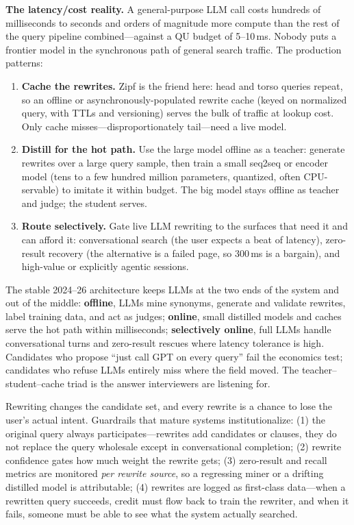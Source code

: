 \textbf{The latency/cost reality.} A general-purpose LLM call costs hundreds of milliseconds to seconds and orders of magnitude more compute than the rest of the query pipeline combined---against a QU budget of 5--10\,ms. Nobody puts a frontier model in the synchronous path of general search traffic. The production patterns:
\begin{enumerate}
    \item \textbf{Cache the rewrites.} Zipf is the friend here: head and torso queries repeat, so an offline or asynchronously-populated rewrite cache (keyed on normalized query, with TTLs and versioning) serves the bulk of traffic at lookup cost. Only cache misses---disproportionately tail---need a live model.
    \item \textbf{Distill for the hot path.} Use the large model offline as a teacher: generate rewrites over a large query sample, then train a small seq2seq or encoder model (tens to a few hundred million parameters, quantized, often CPU-servable) to imitate it within budget. The big model stays offline as teacher and judge; the student serves.
    \item \textbf{Route selectively.} Gate live LLM rewriting to the surfaces that need it and can afford it: conversational search (the user expects a beat of latency), zero-result recovery (the alternative is a failed page, so 300\,ms is a bargain), and high-value or explicitly agentic sessions.
\end{enumerate}

\begin{keyinsight}
The stable 2024--26 architecture keeps LLMs at the two ends of the system and out of the middle: \textbf{offline}, LLMs mine synonyms, generate and validate rewrites, label training data, and act as judges; \textbf{online}, small distilled models and caches serve the hot path within milliseconds; \textbf{selectively online}, full LLMs handle conversational turns and zero-result rescues where latency tolerance is high. Candidates who propose ``just call GPT on every query'' fail the economics test; candidates who refuse LLMs entirely miss where the field moved. The teacher--student--cache triad is the answer interviewers are listening for.
\end{keyinsight}

\begin{warningbox}
Rewriting changes the candidate set, and every rewrite is a chance to lose the user's actual intent. Guardrails that mature systems institutionalize: (1) the original query always participates---rewrites add candidates or clauses, they do not replace the query wholesale except in conversational completion; (2) rewrite confidence gates how much weight the rewrite gets; (3) zero-result and recall metrics are monitored \textit{per rewrite source}, so a regressing miner or a drifting distilled model is attributable; (4) rewrites are logged as first-class data---when a rewritten query succeeds, credit must flow back to train the rewriter, and when it fails, someone must be able to see what the system actually searched.
\end{warningbox}

